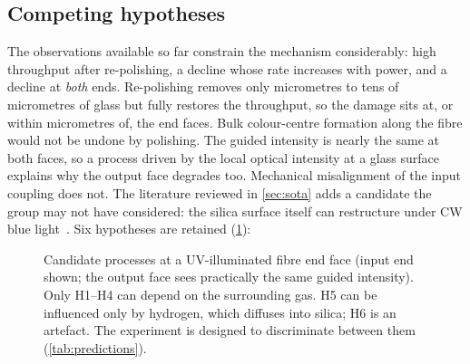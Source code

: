 \subsection{Competing hypotheses}
The observations available so far constrain the mechanism considerably: high throughput after
re-polishing, a decline whose rate increases with power, and a decline at \emph{both} ends. Re-polishing
removes only micrometres to tens of micrometres of glass but fully restores the throughput, so the
damage sits at, or within micrometres of, the end faces. Bulk colour-centre formation along the fibre
would not be undone by polishing. The guided intensity is nearly the same at both faces, so a process
driven by the local optical intensity at a glass surface explains why the output face degrades too.
Mechanical misalignment of the input coupling does not. The literature reviewed in \cref{sec:sota} adds
a candidate the group may not have considered: the silica surface itself can restructure under CW blue
light~\cite{Gonschior2013JNCS}. Six hypotheses are retained (\cref{fig:mechanisms}):

\begin{figure}[tbp]
  \centering
  
  \caption{Candidate processes at a UV-illuminated fibre end face (input end shown; the output face sees
  practically the same guided intensity). Only H1--H4 can depend on the surrounding gas. H5 can be
  influenced only by hydrogen, which diffuses into silica; H6 is an artefact. The experiment is designed
  to discriminate between them (\cref{tab:predictions}).}
  \label{fig:mechanisms}
\end{figure}

